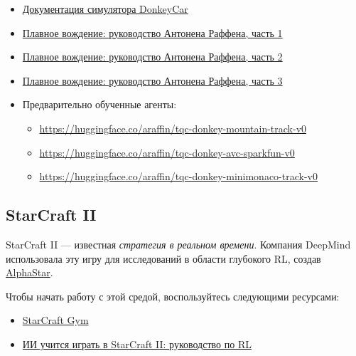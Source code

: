 \documentclass[11pt,a4paper]{article}
\begin{document}
\begin{itemize}
\item
  \href{https://docs.donkeycar.com/guide/deep_learning/simulator/}{Документация симулятора DonkeyCar}
\item
  \href{https://www.youtube.com/watch?v=ngK33h00iBE}{Плавное вождение: руководство Антонена Раффена, часть 1}
\item
  \href{https://www.youtube.com/watch?v=DUqssFvcSOY}{Плавное вождение: руководство Антонена Раффена, часть 2}
\item
  \href{https://www.youtube.com/watch?v=v8j2bpcE4Rg}{Плавное вождение: руководство Антонена Раффена, часть 3}
\item
  Предварительно обученные агенты:

  \begin{itemize}
  \tightlist
  \item
    \url{https://huggingface.co/araffin/tqc-donkey-mountain-track-v0}
  \item
    \url{https://huggingface.co/araffin/tqc-donkey-avc-sparkfun-v0}
  \item
    \url{https://huggingface.co/araffin/tqc-donkey-minimonaco-track-v0}
  \end{itemize}
\end{itemize}

\subsection{StarCraft II}\label{starcraft-ii}


StarCraft II --- известная \emph{стратегия в реальном времени}. Компания DeepMind использовала эту игру для исследований в области глубокого RL, создав \href{https://www.deepmind.com/blog/alphastar-mastering-the-real-time-strategy-game-starcraft-ii}{AlphaStar}.

Чтобы начать работу с этой средой, воспользуйтесь следующими ресурсами:

\begin{itemize}
\item
  \href{http://starcraftgym.com/}{StarCraft Gym}
\item
  \href{https://www.youtube.com/watch?v=q59wap1ELQ4}{ИИ учится играть в StarCraft II: руководство по RL}
\end{itemize}
\end{document}
